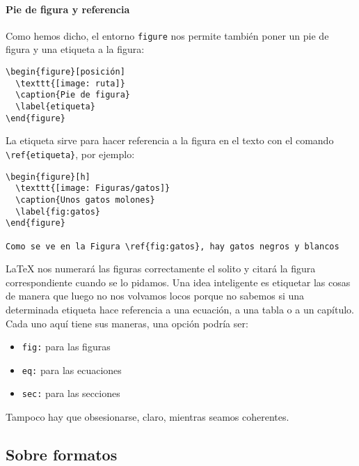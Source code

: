 \paragraph{Pie de figura y referencia}\label{sec:caption}

Como hemos dicho, el entorno \lstinline!figure! nos permite también
poner un pie de figura y una etiqueta a la figura:

\begin{lstlisting}[language={[latex]tex}]
\begin{figure}[posición]
  \texttt{[image: ruta]}
  \caption{Pie de figura}
  \label{etiqueta}
\end{figure}
\end{lstlisting}

La etiqueta sirve para hacer referencia a la figura en el texto con el
comando \lstinline!\ref{etiqueta}!, por ejemplo:

\begin{lstlisting}[language={[latex]tex}]
\begin{figure}[h]
  \texttt{[image: Figuras/gatos]}
  \caption{Unos gatos molones}
  \label{fig:gatos}
\end{figure}

Como se ve en la Figura \ref{fig:gatos}, hay gatos negros y blancos
\end{lstlisting}

LaTeX nos numerará las figuras correctamente el solito y citará la
figura correspondiente cuando se lo pidamos. Una idea inteligente es
etiquetar las cosas de manera que luego no nos volvamos locos porque no
sabemos si una determinada etiqueta hace referencia a una ecuación, a
una tabla o a un capítulo. Cada uno aquí tiene sus maneras, una opción
podría ser:

\begin{itemize}
\item
  \lstinline!fig:! para las figuras
\item
  \lstinline!eq:! para las ecuaciones
\item
  \lstinline!sec:! para las secciones
\end{itemize}

Tampoco hay que obsesionarse, claro, mientras seamos coherentes.

\subsection{Sobre formatos}\label{sec:formatos}

